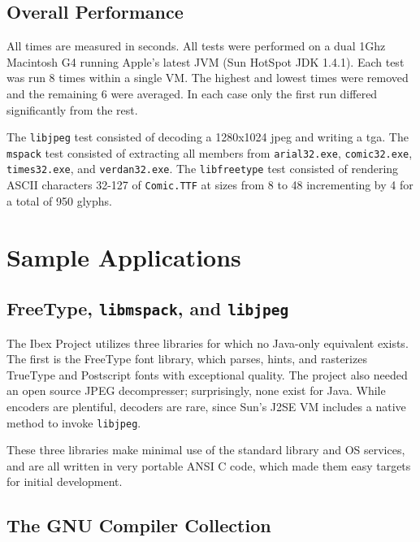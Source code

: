 \documentclass{acmconf}
\begin{document}
\subsection{Overall Performance}

All times are measured in seconds.  All tests were performed on a dual
1Ghz Macintosh G4 running Apple's latest JVM (Sun HotSpot JDK
1.4.1). Each test was run 8 times within a single VM. The highest and
lowest times were removed and the remaining 6 were averaged.  In each
case only the first run differed significantly from the rest.

The {\tt libjpeg} test consisted of decoding a 1280x1024 jpeg and
writing a tga.  The {\tt mspack} test consisted of extracting all
members from {\tt arial32.exe}, {\tt comic32.exe}, {\tt times32.exe},
and {\tt verdan32.exe}. The {\tt libfreetype} test consisted of
rendering ASCII characters 32-127 of {\tt Comic.TTF} at sizes from 8
to 48 incrementing by 4 for a total of 950 glyphs.




\section{Sample Applications}

\subsection{FreeType, {\tt libmspack}, and {\tt libjpeg}}

The Ibex Project utilizes three libraries for which no Java-only
equivalent exists.  The first is the FreeType font library, which
parses, hints, and rasterizes TrueType and Postscript fonts with
exceptional quality.  The project also needed an open source JPEG
decompresser; surprisingly, none exist for Java.  While encoders are
plentiful, decoders are rare, since Sun's J2SE VM includes a native
method to invoke {\tt libjpeg}.

These three libraries make minimal use of the standard library and OS
services, and are all written in very portable ANSI C code, which made
them easy targets for initial development.

\subsection{The GNU Compiler Collection}
\end{document}
